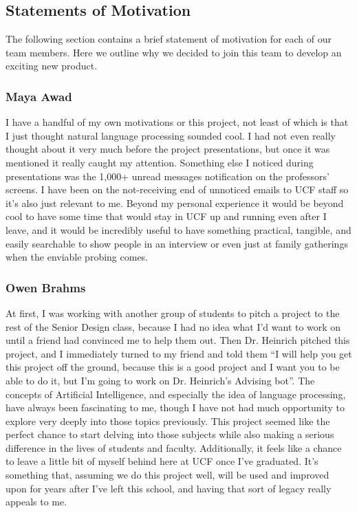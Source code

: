 \documentclass[titlepage, 12pt]{article}
\begin{document}
\subsection{Statements of Motivation}

The following section contains a brief statement of motivation for each of our team members. Here we outline why we decided to join this team to develop an exciting new product.

\subsubsection{Maya Awad}

I have a handful of my own motivations or this project, not least of which is that I just thought natural language processing sounded cool. I had not even really thought about it very much before the project presentations, but once it was mentioned it really caught my attention. Something else I noticed during presentations was the 1,000+ unread messages notification on the professors’ screens. I have been on the not-receiving end of unnoticed emails to UCF staff so it’s also just relevant to me. Beyond my personal experience it would be beyond cool to have some time that would stay in UCF up and running even after I leave, and it would be incredibly useful to have something practical, tangible, and easily searchable to show people in an interview or even just at family gatherings when the enviable probing comes.

\subsubsection{Owen Brahms}

At first, I was working with another group of students to pitch a project to the rest of the Senior Design class, because I had no idea what I’d want to work on until a friend had convinced me to help them out. Then Dr. Heinrich pitched this project, and I immediately turned to my friend and told them “I will help you get this project off the ground, because this is a good project and I want you to be able to do it, but I’m going to work on Dr. Heinrich’s Advising bot”. The concepts of Artificial Intelligence, and especially the idea of language processing, have always been fascinating to me, though I have not had much opportunity to explore very deeply into those topics previously. This project seemed like the perfect chance to start delving into those subjects while also making a serious difference in the lives of students and faculty. Additionally, it feels like a chance to leave a little bit of myself behind here at UCF once I’ve graduated. It’s something that, assuming we do this project well, will be used and improved upon for years after I’ve left this school, and having that sort of legacy really appeals to me.
\end{document}
